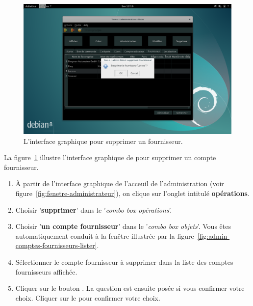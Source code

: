 
\newpage
{}

\begin{figure}[!htpb]
	\centering
	\includegraphics[scale=0.39]{images/compte-fournisseur-supprimer.png}
	\caption{L'interface graphique pour supprimer un fournisseur.}
	\label{fig:admin-comptes-fournisseurs-supprimer}
\end{figure}

La figure~\ref{fig:admin-comptes-fournisseurs-supprimer}
illustre l'interface graphique de \yeroth pour supprimer
un compte fournisseur.

\begin{enumerate}[1)]
	\item \`A partir de l'interface graphique de l'acceuil de
		l'administration (voir figure~\ref{fig:fenetre-administrateur}),
		on clique sur l'onglet intitul\'e \textbf{op\'erations}. 
		
	\item Choisir '\textbf{supprimer}' dans le '\emph{combo box
		op\'erations}'.
		
	\item Choisir '\textbf{un compte fournisseur}' dans le
		'\emph{combo box objets}'. Vous \^etes automatiquement
		conduit \`a la fen\^etre illustr\'ee par la
		figure~\ref{fig:admin-comptes-fournisseurs-lister}.
		
	\item S\'electionner le compte fournisseur \`a supprimer
		dans la liste des comptes fournisseurs affich\'ee.
		
	\item Cliquer sur le bouton . La question
		est ensuite pos\'ee si vous confirmer votre choix.
		Cliquer sur le  pour confirmer votre choix.
\end{enumerate}
